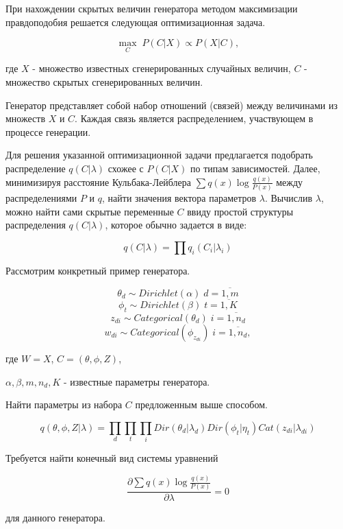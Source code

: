 \begin{problem}
При нахождении скрытых величин генератора методом максимизации правдоподобия решается следующая оптимизационная задача.

\[
\underset{C}{\max} \; P(C \vert X) \varpropto P(X \vert C),
\]

\noindent где $X$ - множество известных сгенерированных случайных величин, $C$ - множество скрытых  сгенерированных величин.

Генератор представляет собой набор отношений (связей) между величинами из множеств $X$ и $C$. 
Каждая связь является распределением, участвующем в процессе генерации. 

Для решения указанной оптимизационной задачи предлагается подобрать распределение $q(C \vert \lambda)$ схожее с $P(C \vert X)$ по типам зависимостей. Далее, минимизируя расстояние Кульбака-Лейблера $\sum q\left(x\right)\log \frac{q\left(x\right)}{P\left(x\right)}  $ между распределениями $P$ и $q$, найти значения вектора параметров $\lambda$. Вычислив $\lambda$, можно найти сами скрытые переменные $C$ ввиду простой структуры распределения $q(C \vert \lambda)$, которое обычно задается в виде:

\[
q(C \vert \lambda) = \prod q_i(C_i \vert \lambda_i) 
\]        

Рассмотрим конкретный пример генератора.

\[
\theta_d \sim Dirichlet(\alpha) \; d = \overline{1,m}
\]
\[
\phi_t \sim Dirichlet(\beta) \; t = \overline{1,K}
\]
\[
z_{di} \sim Categorical(\theta_d) \; i = \overline{1,n_d}
\]
\[
w_{di} \sim Categorical(\phi_{z_{di}}) \; i = \overline{1,n_d},
\]
 
где $W = X$, $C = (\theta, \phi, Z)$, 

$\alpha, \beta, m, n_d, K$ - известные параметры генератора.  

\noindent Найти параметры из набора $C$ предложенным выше способом.  

\begin{ordre}
 
\[
q(\theta, \phi, Z \vert \lambda) = \underset{d}{\prod}\underset{t}{\prod}\underset{i}{\prod} Dir(\theta_d | \lambda_{d}) Dir(\phi_t | \eta_{t}) Cat(z_{di} | \lambda_{di})
\]

Требуется найти конечный вид системы уравнений 

\[
\frac{\partial \sum q\left(x\right)\log \frac{q\left(x\right)}{P\left(x\right)} } {\partial \lambda} = 0
\]  

для данного генератора.


\end{ordre}
\end{problem}
